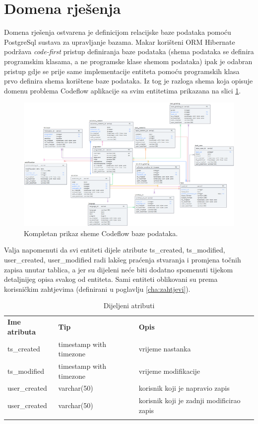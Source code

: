 \documentclass[times, utf8, zavrsni]{fer}
\begin{document}
		\section{Domena rješenja}
		Domena rješenja ostvarena je definicijom relacijske baze podataka pomoću PostgreSql sustava za upravljanje bazama. Makar korišteni ORM Hibernate podržava \textit{code-first} pristup definiranja baze podataka (shema podataka se definira programskim klasama, a ne programske klase shemom podataka) ipak je odabran pristup gdje se prije same implementacije entiteta pomoću programskih klasa prvo definira shema korištene baze podataka. Iz tog je razloga shema koja opisuje domenu problema Codeflow aplikacije sa svim entitetima prikazana na slici \ref{fig:db}.
		\begin{figure}[H]
			\centering
			\includegraphics[width=\linewidth]{pictures/prikazi/Database.png}
			\caption{Kompletan prikaz sheme Codeflow baze podataka.}
			\label{fig:db}
		\end{figure}
		Valja napomenuti da svi entiteti dijele atribute ts\_created, ts\_modified, user\_created, user\_modified radi lakšeg praćenja stvaranja i promjena točnih zapisa unutar tablica, a jer su dijeleni neće biti dodatno spomenuti tijekom detaljnijeg opisa svakog od entiteta. Sami entiteti oblikovani su prema korisničkim zahtjevima (definirani u poglavlju \ref{cha:zahtjevi}).
		\begin{table}[H]
			\caption{Dijeljeni atributi}
			\label{tbl:dij-attr}
			\centering
			\begin{tabu} to \textwidth {XXX}
				\tabucline[1.75pt]{-}
				\textbf{Ime atributa} & \textbf{Tip} & \textbf{Opis}\\				
				\tabucline[1pt]{-}
				ts\_created & timestamp with timezone & vrijeme nastanka\\ \hline
				ts\_modified & timestamp with timezone & vrijeme modifikacije\\ \hline
				user\_created & varchar(50) & korisnik koji je napravio zapis\\ \hline
				user\_created & varchar(50) & korisnik koji je zadnji modificirao zapis\\
				\tabucline[1.75pt]{-}
			\end{tabu}
		\end{table}
		
\end{document}
